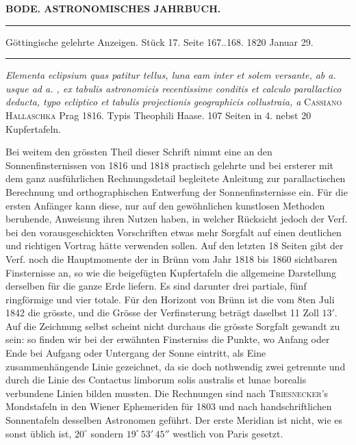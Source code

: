 \clearpage
\begingroup
\pagestyle{empty}
\thispagestyle{empty}
\noindent\makebox[10mm][l]{}%
\parbox[b]{\dimexpr\textwidth-20mm\relax}{\centering\small\textbf{BODE. ASTRONOMISCHES JAHRBUCH.}}%
\par\nobreak\medskip
\begin{center}
\parbox{.92\linewidth}{\centering\small
\rule{\linewidth}{.3pt}\par\smallskip
Göttingische gelehrte Anzeigen. Stück 17. Seite 167..168. 1820 Januar 29.\par\smallskip
\rule{\linewidth}{.3pt}}
\end{center}
\par\medskip

\emph{Elementa eclipsium quas patitur tellus, luna eam inter et solem versante, ab a. {} usque ad a. {}, ex tabulis astronomicis recentissime conditis et calculo parallactico deducta, typo ecliptico et tabulis projectionis geographicis collustraia, a} \textsc{Cassiano Hallaschka} Prag 1816. Typis Theophili Haase. 107 Seiten in 4. nebst 20 Kupfertafeln.

Bei weitem den grössten Theil dieser Schrift nimmt eine an den Sonnenfinsternissen von 1816 und 1818 practisch gelehrte und bei ersterer mit dem ganz ausführlichen Rechnungsdetail begleitete Anleitung zur parallactischen Berechnung und orthographischen Entwerfung der Sonnenfinsternisse ein. Für die ersten Anfänger kann diese, nur auf den gewöhnlichen kunstlosen Methoden beruhende, Anweisung ihren Nutzen haben, in welcher Rücksicht jedoch der Verf. bei den vorausgeschickten Vorschriften etwas mehr Sorgfalt auf einen deutlichen und richtigen Vortrag hätte verwenden sollen. Auf den letzten 18 Seiten gibt der Verf. noch die Hauptmomente der in Brünn vom Jahr 1818 bis 1860 sichtbaren Finsternisse an, so wie die beigefügten Kupfertafeln die allgemeine Darstellung derselben für die ganze Erde liefern. Es sind darunter drei partiale, fünf ringförmige und vier totale. Für den Horizont von Brünn ist die vom 8ten Juli 1842 die grösste, und die Grösse der Verfinsterung beträgt daselbst 11 Zoll $13'$. Auf die Zeichnung selbst scheint nicht durchaus die grösste Sorgfalt gewandt zu sein: so finden wir bei der erwähnten Finsterniss die Punkte, wo Anfang oder Ende bei Aufgang oder Untergang der Sonne eintritt, als Eine zusammenhängende Linie gezeichnet, da sie doch nothwendig zwei getrennte und durch die Linie des Contactus limborum solis australis et lunae borealis verbundene Linien bilden mussten. Die Rechnungen sind nach \textsc{Triesnecker}'s Mondstafeln in den Wiener Ephemeriden für 1803 und nach handschriftlichen Sonnentafeln desselben Astronomen geführt. Der erste Meridian ist nicht, wie es sonst üblich ist, $20^\circ$ sondern $19^\circ\,53'\,45''$ westlich von Paris gesetzt.
